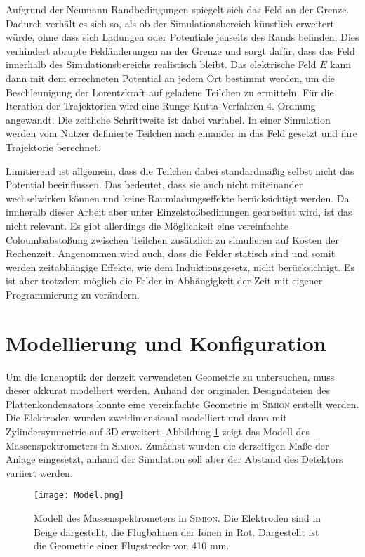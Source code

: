 Aufgrund der Neumann-Randbedingungen spiegelt sich das Feld an der Grenze. Dadurch verhält es sich so, als ob der Simulationsbereich künstlich erweitert würde, ohne dass sich Ladungen oder Potentiale jenseits des Rands befinden. Dies verhindert abrupte Feldänderungen an der Grenze und sorgt dafür, dass das Feld innerhalb des Simulationsbereichs realistisch bleibt. Das elektrische Feld $E$ kann dann mit dem errechneten Potential an jedem Ort bestimmt werden, um die Beschleunigung der Lorentzkraft auf geladene Teilchen zu ermitteln. Für die Iteration der Trajektorien wird eine Runge-Kutta-Verfahren 4. Ordnung angewandt. Die zeitliche Schrittweite ist dabei variabel. In einer Simulation werden vom Nutzer definierte Teilchen nach einander in das Feld gesetzt und ihre Trajektorie berechnet. 

Limitierend ist allgemein, dass die Teilchen dabei standardmäßig selbst nicht das Potential beeinflussen. Das bedeutet, dass sie auch nicht miteinander wechselwirken können und keine Raumladungseffekte berücksichtigt werden. Da innheralb dieser Arbeit aber unter Einzelstoßbedinungen gearbeitet wird, ist das nicht relevant. Es gibt allerdings die Möglichkeit eine vereinfachte Coloumbabstoßung zwischen Teilchen zusätzlich zu simulieren auf Kosten der Rechenzeit. Angenommen wird auch, dass die Felder statisch sind und somit werden zeitabhängige Effekte, wie dem Induktionsgesetz, nicht berücksichtigt. Es ist aber trotzdem möglich die Felder in Abhängigkeit der Zeit mit eigener Programmierung zu verändern.

\section{Modellierung und Konfiguration}
Um die Ionenoptik der derzeit verwendeten Geometrie zu untersuchen, muss dieser akkurat modelliert werden. Anhand der originalen Designdateien des Plattenkondensators konnte eine vereinfachte Geometrie in \textsc{Simion} erstellt werden. Die Elektroden wurden zweidimensional modelliert und dann mit Zylindersymmetrie auf 3D erweitert. Abbildung \ref{fig:model} zeigt das Modell des Massenspektrometers in \textsc{Simion}. Zunächst wurden die derzeitigen Maße der Anlage eingesetzt, anhand der Simulation soll aber der Abstand des Detektors variiert werden.

\begin{figure}
    \centering
    \texttt{[image: Model.png]}
    \caption[Modell des Massenspektrometers in \textsc{Simion}]{Modell des Massenspektrometers in \textsc{Simion}. Die Elektroden sind in Beige dargestellt, die Flugbahnen der Ionen in Rot. Dargestellt ist die Geometrie einer Flugstrecke von 410 mm.}
    \label{fig:model}
\end{figure}

